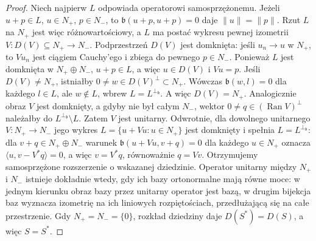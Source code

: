 \begin{proof}
Niech najpierw $L$ odpowiada operatorowi samosprzężonemu.
Jeżeli $u+p\in L$, $u\in N_+$, $p\in N_-$, to
$\mathfrak b(u+p,u+p)=0$ daje $\|u\|=\|p\|$.
Rzut $L$ na $N_+$ jest więc różnowartościowy, a $L$
ma postać wykresu pewnej izometrii
$V:D(V)\subseteq N_+\to N_-$. Podprzestrzeń $D(V)$
jest domknięta: jeśli $u_n\to u$ w $N_+$, to
$Vu_n$ jest ciągiem Cauchy'ego i zbiega do pewnego $p\in N_-$.
Ponieważ $L$ jest domknięta w $N_+\oplus N_-$,
$u+p\in L$, a więc $u\in D(V)$ i $Vu=p$. Jeśli $D(V)\ne N_+$,
istniałby $0\ne w\in D(V)^\perp\subset N_+$.
Wówczas $\mathfrak b(w,l)=0$ dla każdego $l\in L$, ale
$w\notin L$, wbrew $L=L^{\perp_{\mathfrak b}}$.
A więc $D(V)=N_+$. Analogicznie obraz $V$ jest domknięty,
a gdyby nie był całym $N_-$, wektor
$0\ne q\in (\operatorname{Ran}V)^\perp$ należałby do
$L^{\perp_{\mathfrak b}}\setminus L$. Zatem $V$ jest unitarny.
Odwrotnie, dla dowolnego unitarnego $V:N_+\to N_-$
jego wykres $L=\{u+Vu:u\in N_+\}$ jest domknięty
i spełnia $L=L^{\perp_{\mathfrak b}}$: dla $v+q\in N_+\oplus N_-$
warunek $\mathfrak b(u+Vu,v+q)=0$ dla każdego $u\in N_+$
oznacza $\langle u,v-V^*q\rangle=0$, a więc $v=V^*q$,
równoważnie $q=Vv$. Otrzymujemy samosprzężone rozszerzenie
o wskazanej dziedzinie. Operator unitarny między $N_+$ i $N_-$
istnieje dokładnie wtedy, gdy ich bazy ortonormalne mają równe moce:
w jednym kierunku obraz bazy przez unitarny operator jest bazą,
w drugim bijekcja baz wyznacza izometrię na ich liniowych
rozpiętościach, przedłużającą się na całe przestrzenie.
Gdy $N_+=N_- =\{0\}$, rozkład dziedziny daje
$D(S^*)=D(S)$, a więc $S=S^*$.
\end{proof}

